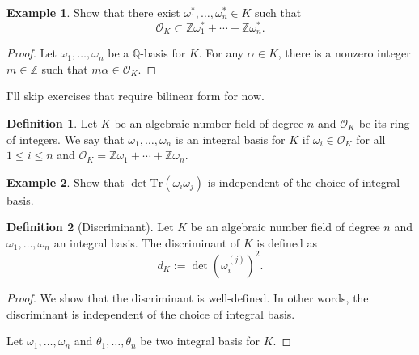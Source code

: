 \documentclass[a4paper]{book}
\theoremstyle{definition}
\newtheorem{definition}{Definition}[]
\newtheorem{example}{Example}[definition]
\begin{document}
\begin{example}
    Show that there exist \(\omega_1^*, \ldots, \omega_n^* \in K\) such that
    \begin{equation*}
        \mathcal{O}_K \subset \mathbb{Z}\omega_1^* + \cdots + \mathbb{Z} \omega_n^* \text{.}
    \end{equation*}
\end{example}
\begin{proof}
    Let \(\omega_1, \ldots, \omega_n\) be a \(\mathbb{Q}\)-basis for \(K\). For any \(\alpha \in K\), there is a nonzero integer \(m \in \mathbb{Z}\) such that \(m \alpha \in \mathcal{O}_K\).
\end{proof}

I'll skip exercises that require bilinear form for now.

\begin{defbox}
    \begin{definition}
        Let \(K\) be an algebraic number field of degree \(n\) and \(\mathcal{O}_K\) be its ring of integers. We say that \(\omega_1, \ldots, \omega_n\) is an integral basis for \(K\) if \(\omega_i \in \mathcal{O}_K\) for all \(1 \leq i \leq n\) and \(\mathcal{O}_K = \mathbb{Z}\omega_1 + \cdots + \mathbb{Z}\omega_n\).
    \end{definition}
\end{defbox}

\begin{example}
    Show that \(\det{\mathrm{Tr}(\omega_i \omega_j)}\) is independent of the choice of integral basis.
\end{example}

\begin{defbox}
    \begin{definition}[Discriminant]
        Let \(K\) be an algebraic number field of degree \(n\) and \(\omega_1, \ldots, \omega_n\) an integral basis. The discriminant of \(K\) is defined as
        \begin{equation*}
            d_K := \det\left(\omega_i^{(j)}\right)^2 \text{.}
        \end{equation*}
    \end{definition}
\end{defbox}

\begin{proof}
    We show that the discriminant is well-defined. In other words, the discriminant is independent of the choice of integral basis.

    Let \(\omega_1, \ldots, \omega_n\) and \(\theta_1, \ldots, \theta_n\) be two integral basis for \(K\).
\end{proof}
\end{document}
